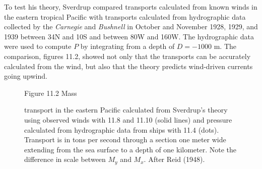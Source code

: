 To test his theory, Sverdrup compared transports calculated from
known winds in the eastern tropical Pacific with transports calculated from hydrographic
data collected by the \textit{Carnegie} and
\textit{Bushnell} in October and November 1928, 1929, and 1939 between 34\degrees N and
10\degrees S and between 80\degrees W and 160\degrees W. The
hydrographic data were used to compute
$P$ by integrating from a depth of $D = -1000$ m. The comparison, figures 11.2,
showed not only that the transports can be accurately calculated from the wind,
but also that the theory predicts wind-driven currents going upwind.

\begin{figure}[t!]
\footnotesize
Figure 11.2  Mass \rule{0mm}{3ex}transport in the eastern Pacific
calculated from Sverdrup's theory using observed winds with 11.8 and 11.10 (solid
lines) and pressure calculated from hydrographic data from ships with 11.4 (dots). Transport is in tons per second through a section one
meter wide extending from the sea surface to a depth of one kilometer. Note the difference in
scale between $M_y$ and $M_x$. After Reid (1948).
\label{fig:windpacific}
\vspace{-4ex}
\end{figure}

